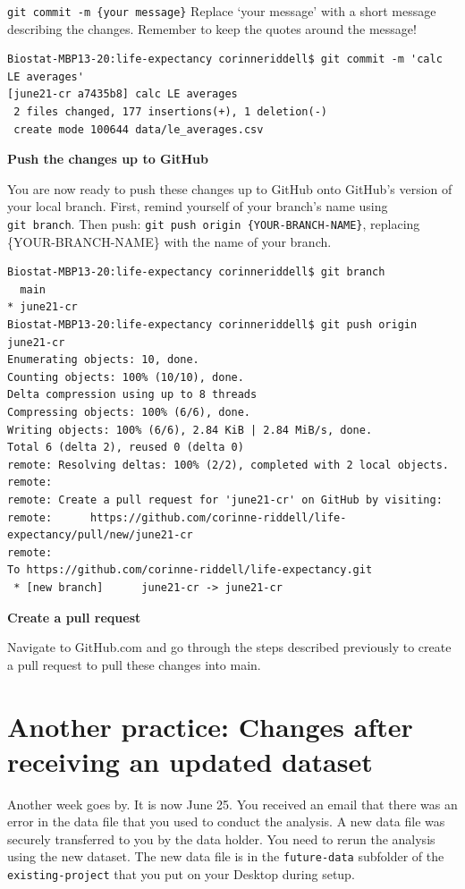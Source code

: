 \documentclass[
]{book}
\begin{document}
\texttt{git\ commit\ -m\ \textquotesingle{}\{your\ message\}\textquotesingle{}}
Replace `your message' with a short message describing the changes. Remember to keep the quotes around the message!

\begin{verbatim}
Biostat-MBP13-20:life-expectancy corinneriddell$ git commit -m 'calc LE averages' 
[june21-cr a7435b8] calc LE averages
 2 files changed, 177 insertions(+), 1 deletion(-)
 create mode 100644 data/le_averages.csv
\end{verbatim}

\textbf{Push the changes up to GitHub}

You are now ready to push these changes up to GitHub onto GitHub's version
of your local branch. First, remind yourself of your branch's name using
\texttt{git\ branch}. Then push: \texttt{git\ push\ origin\ \{YOUR-BRANCH-NAME\}}, replacing
\{YOUR-BRANCH-NAME\} with the name of your branch.

\begin{verbatim}
Biostat-MBP13-20:life-expectancy corinneriddell$ git branch
  main
* june21-cr
Biostat-MBP13-20:life-expectancy corinneriddell$ git push origin june21-cr
Enumerating objects: 10, done.
Counting objects: 100% (10/10), done.
Delta compression using up to 8 threads
Compressing objects: 100% (6/6), done.
Writing objects: 100% (6/6), 2.84 KiB | 2.84 MiB/s, done.
Total 6 (delta 2), reused 0 (delta 0)
remote: Resolving deltas: 100% (2/2), completed with 2 local objects.
remote: 
remote: Create a pull request for 'june21-cr' on GitHub by visiting:
remote:      https://github.com/corinne-riddell/life-expectancy/pull/new/june21-cr
remote: 
To https://github.com/corinne-riddell/life-expectancy.git
 * [new branch]      june21-cr -> june21-cr
\end{verbatim}

\textbf{Create a pull request}

Navigate to GitHub.com and go through the steps described previously to
create a pull request to pull these changes into main.

\section{Another practice: Changes after receiving an updated dataset}\label{another-practice-changes-after-receiving-an-updated-dataset}

Another week goes by. It is now June 25. You received an email that there was an
error in the data file that you used to conduct the analysis. A new data file
was securely transferred to you by the data holder. You need to rerun the analysis
using the new dataset. The new data file is in the \texttt{future-data} subfolder of the \texttt{existing-project} that you put on your Desktop during setup.
\end{document}

